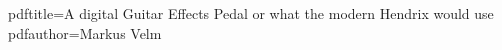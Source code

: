 \newcommand*{\mytitle}{A digital Guitar Effects Pedal or what the \newline modern Hendrix would use}
\newcommand*{\mysubtitle}{Subtitle}
\newcommand*{\myauthor}{Markus Velm}
\newcommand*{\hochschule}{Hochschule Karlsruhe}
\newcommand*{\fakultaet}{Fakult\"{a}t f\"{u}r Elektro- und Informationstechnik}
\newcommand*{\course}{Electrical- and Information Engineering}
\newcommand*{\semester}{Two}
\newcommand*{\abgabeTermin}{Termin}
\newcommand*{\prof}{Prof. Dr. Manfred Litzenburger}
\newcommand*{\betreuer}{Prof. Dr. Manfred Litzenburger}
\newcommand*{\ort}{Karlsruhe}

\hypersetup
{
	pdftitle=\mytitle
	pdfauthor=\myauthor
}

